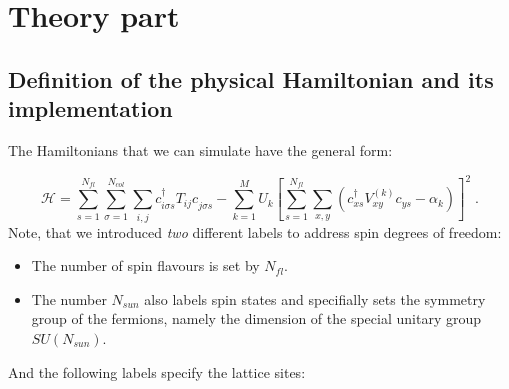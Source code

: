 \section{Theory part}


\subsection{Definition of the physical Hamiltonian and its implementation}

The Hamiltonians that we can simulate have the general form:

\begin{equation}
\label{eqn_general_ham2}
\mathcal{H}
=
\sum\limits_{s=1}^{N_{fl}}
\sum\limits_{\sigma=1}^{N_{col}}
\sum\limits_{i,j}
c^{\dagger}_{i \sigma   s}T_{ij}c^{\phantom\dagger}_{j \sigma s}
-\sum\limits_{k=1}^{M}U_{k}\left[
\sum\limits_{s=1}^{N_{fl}}\sum\limits_{x,y}
\left( 
c^{\dagger}_{xs}V^{(k)}_{xy}c^{\phantom\dagger}_{y s}-\alpha_{k}
\right)
\right]^{2}\;.
\end{equation}
Note, that  we introduced \textit{two} different labels to address spin degrees of freedom:
\begin{itemize}
\item The number of spin flavours is set by $N_{fl}$. 
\item The number $N_{sun}$ also labels spin states and specifially sets the symmetry group of the fermions, namely 
the dimension of the special unitary group $SU(N_{sun})$.
\end{itemize}
And the following labels specify the lattice sites:
